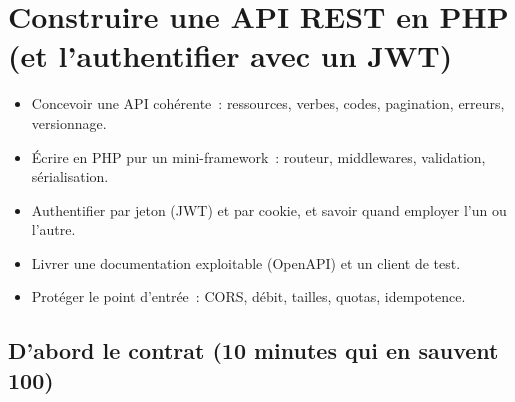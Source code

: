 \documentclass[12pt,a4paper,twoside,openright]{book}
\begin{document}
\chapter{Construire une API REST en PHP (et l'authentifier avec un JWT)}
\label{ch-php-api}

\begin{objectif}
\begin{itemize}
  \item Concevoir une API coh\'erente~: ressources, verbes, codes, pagination, erreurs, versionnage.
  \item \'Ecrire en PHP pur un mini-framework~: routeur, middlewares, validation, s\'erialisation.
  \item Authentifier par jeton (JWT) et par cookie, et savoir quand employer l'un ou l'autre.
  \item Livrer une documentation exploitable (OpenAPI) et un client de test.
  \item Prot\'eger le point d'entr\'ee~: CORS, d\'ebit, tailles, quotas, idempotence.
\end{itemize}
\end{objectif}

\section{D'abord le contrat (10 minutes qui en sauvent 100)}
\end{document}
